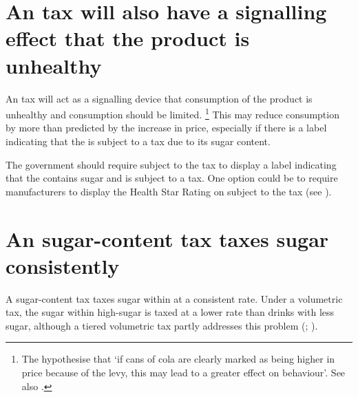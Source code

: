 \documentclass[embargoed]{grattan}
\begin{document}
\section{An \SSB{} tax will also have a signalling effect that the product is unhealthy }\label{an-ssb-tax-will-also-have-a-signalling-effect-that-the-product-is-unhealthy}

An \SSB{} tax will act as a signalling device that consumption of the product is unhealthy and consumption should be limited.%
\footnote{The \textcite{Team2016Sugartaxhow} hypothesise that `if cans of cola are clearly marked as being higher in price because of the levy, this may lead to a greater effect on behaviour'.
See also \textcites{Yang2010Gainweightgoing}{Thow2011Taxingsoftdrinks}{Friedman2012Sugarsweetenedbeverage}{Sassi2013rolefiscalpolicies}{Thow2010effectfiscalpolicy}{Kaplin2011NationalStrategyCombat}{Kaplin2013Usingeconomicpolicy}.} This may reduce consumption by more than predicted by the increase in price, especially if there is a label indicating that the \SSB{} is subject to a tax due to its sugar content.

The government should require \SSBs{} subject to the tax to display a label indicating that the \SSB{} contains sugar and is subject to a tax.
One option could be to require \SSB{} manufacturers to display the Health Star Rating on \SSBs{} subject to the tax (see ).

\section{An \SSB{} sugar-content tax taxes sugar consistently}\label{an-ssb-sugar-content-tax-taxes-sugar-consistently}

A sugar-content tax taxes sugar within \SSBs{} at a consistent rate.
Under a volumetric tax, the sugar within high-sugar \SSBs{} is taxed at a lower rate than drinks with less sugar, although a tiered volumetric tax partly addresses this problem (; ).
\end{document}
